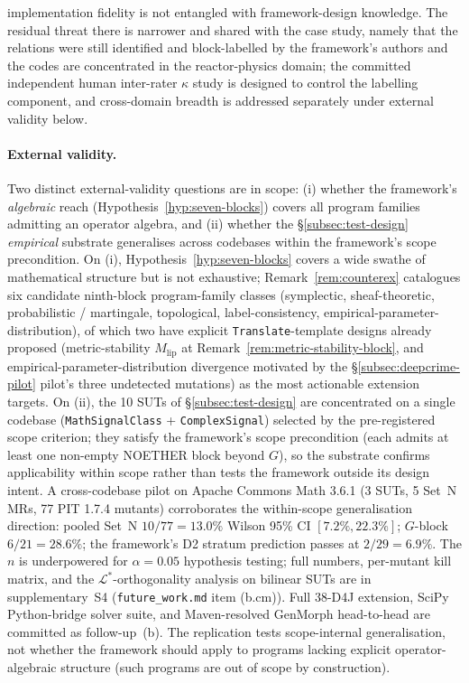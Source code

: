 \documentclass[manuscript]{acmart}
\begin{document}
implementation fidelity is not entangled with framework-design knowledge. The residual threat there is narrower and shared with the case study, namely that the relations were still identified and block-labelled by the framework's authors and the codes are concentrated in the reactor-physics domain; the committed independent human inter-rater $\kappa$ study is designed to control the labelling component, and cross-domain breadth is addressed separately under external validity below.

\paragraph{External validity.} Two distinct external-validity questions are in scope: (i) whether the framework's \emph{algebraic} reach (Hypothesis~\ref{hyp:seven-blocks}) covers all program families admitting an operator algebra, and (ii) whether the \S\ref{subsec:test-design} \emph{empirical} substrate generalises across codebases within the framework's scope precondition. On (i), Hypothesis~\ref{hyp:seven-blocks} covers a wide swathe of mathematical structure but is not exhaustive; Remark~\ref{rem:counterex} catalogues six candidate ninth-block program-family classes (symplectic, sheaf-theoretic, probabilistic / martingale, topological, label-consistency, empirical-parameter-distribution), of which two have explicit \texttt{Translate}-template designs already proposed (metric-stability $M_{\mathrm{lip}}$ at Remark~\ref{rem:metric-stability-block}, and empirical-parameter-distribution divergence motivated by the \S\ref{subsec:deepcrime-pilot} pilot's three undetected mutations) as the most actionable extension targets. On (ii), the 10 SUTs of \S\ref{subsec:test-design} are concentrated on a single codebase (\texttt{MathSignalClass} + \texttt{ComplexSignal}) selected by the pre-registered scope criterion; they satisfy the framework's scope precondition (each admits at least one non-empty NOETHER block beyond $G$), so the substrate confirms applicability within scope rather than tests the framework outside its design intent. A cross-codebase pilot on Apache Commons Math 3.6.1 (3 SUTs, 5 Set~N MRs, 77 PIT 1.7.4 mutants) corroborates the within-scope generalisation direction: pooled Set~N $10/77 = 13.0\%$ Wilson 95\% CI $[7.2\%, 22.3\%]$; $G$-block $6/21 = 28.6\%$; the framework's D2 stratum prediction passes at $2/29 = 6.9\%$. The $n$ is underpowered for $\alpha = 0.05$ hypothesis testing; full numbers, per-mutant kill matrix, and the $\mathcal{L}^{*}$-orthogonality analysis on bilinear SUTs are in supplementary~S4 (\texttt{future\_work.md} item (b.cm)). Full $38$-D4J extension, SciPy Python-bridge solver suite, and Maven-resolved GenMorph head-to-head are committed as follow-up~(b). The replication tests scope-internal generalisation, not whether the framework should apply to programs lacking explicit operator-algebraic structure (such programs are out of scope by construction).
\end{document}
